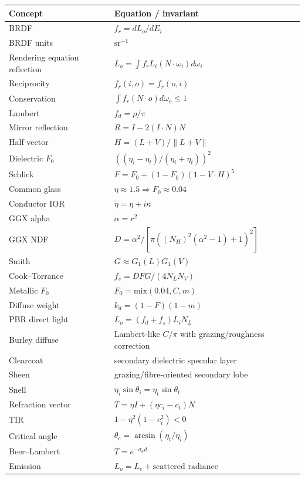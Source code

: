 {\def\LTcaptype{none} %
\begin{longtable}[]{@{}
  >{\raggedright\arraybackslash}p{}
  >{\raggedright\arraybackslash}p{}@{}}
\toprule\noalign{}
\begin{minipage}[b]{\linewidth}\raggedright
Concept
\end{minipage} & \begin{minipage}[b]{\linewidth}\raggedright
Equation / invariant
\end{minipage} \\
\midrule\noalign{}
\endhead
\bottomrule\noalign{}
\endlastfoot
BRDF & \(f_r=dL_o/dE_i\) \\
BRDF units & \(\mathrm{sr}^{-1}\) \\
Rendering equation reflection & \(L_o=\int f_rL_i(N\cdot\omega_i)d\omega_i\) \\
Reciprocity & \(f_r(i,o)=f_r(o,i)\) \\
Conservation & \(\int f_r(N\cdot o)d\omega_o\le1\) \\
Lambert & \(f_d=\rho/\pi\) \\
Mirror reflection & \(R=I-2(I\cdot N)N\) \\
Half vector & \(H=(L+V)/\|L+V\|\) \\
Dielectric \(F_0\) & \(((\eta_i-\eta_t)/(\eta_i+\eta_t))^2\) \\
Schlick & \(F=F_0+(1-F_0)(1-V\cdot H)^5\) \\
Common glass & \(\eta\approx1.5\Rightarrow F_0\approx0.04\) \\
Conductor IOR & \(\tilde{\eta}=\eta+i\kappa\) \\
GGX alpha & \(\alpha=r^2\) \\
GGX NDF & \(D=\alpha^2/[\pi((N_H)^2(\alpha^2-1)+1)^2]\) \\
Smith & \(G\approx G_1(L)G_1(V)\) \\
Cook--Torrance & \(f_s=DFG/(4N_LN_V)\) \\
Metallic \(F_0\) & \(F_0=\text{mix}(0.04,C,m)\) \\
Diffuse weight & \(k_d=(1-F)(1-m)\) \\
PBR direct light & \(L_o=(f_d+f_s)L_iN_L\) \\
Burley diffuse & Lambert-like \(C/\pi\) with grazing/roughness correction \\
Clearcoat & secondary dielectric specular layer \\
Sheen & grazing/fibre-oriented secondary lobe \\
Snell & \(\eta_i\sin\theta_i=\eta_t\sin\theta_t\) \\
Refraction vector & \(T=\eta I+(\eta c_i-c_t)N\) \\
TIR & \(1-\eta^2(1-c_i^2)<0\) \\
Critical angle & \(\theta_c=\arcsin(\eta_t/\eta_i)\) \\
Beer--Lambert & \(T=e^{-\sigma_a d}\) \\
Emission & \(L_o=L_e+\text{scattered radiance}\) \\
\end{longtable}
}

